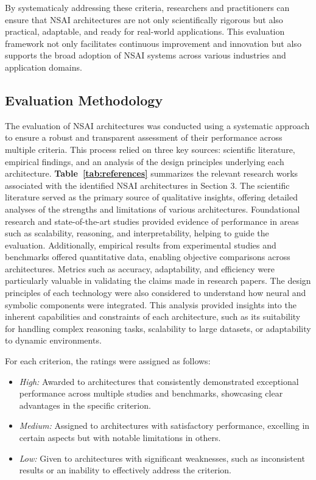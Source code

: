 \documentclass[12pt]{article}
\begin{document}
\noindent By systematicaly addressing these criteria, researchers and practitioners can ensure that NSAI architectures are not only scientifically rigorous but also practical, adaptable, and ready for real-world applications. This evaluation framework not only facilitates continuous improvement and innovation but also supports the broad adoption of NSAI systems across various industries and application domains.

\subsection{Evaluation Methodology}

\noindent The evaluation of NSAI architectures was conducted using a systematic approach to ensure a robust and transparent assessment of their performance across multiple criteria. This process relied on three key sources: scientific literature, empirical findings, and an analysis of the design principles underlying each architecture. \textbf{Table~\ref{tab:references}} summarizes the relevant research works associated with the identified NSAI architectures in Section 3. %
 The scientific literature served as the primary source of qualitative insights, offering detailed analyses of the strengths and limitations of various architectures. Foundational research and state-of-the-art studies provided evidence of performance in areas such as scalability, reasoning, and interpretability, helping to guide the evaluation. Additionally, empirical results from experimental studies and benchmarks offered quantitative data, enabling objective comparisons across architectures. Metrics such as accuracy, adaptability, and efficiency were particularly valuable in validating the claims made in research papers. The design principles of each technology were also considered to understand how neural and symbolic components were integrated. This analysis provided insights into the inherent capabilities and constraints of each architecture, such as its suitability for handling complex reasoning tasks, scalability to large datasets, or adaptability to dynamic environments.

\vspace*{0.5cm}

\noindent For each criterion, the ratings were assigned as follows:

\begin{itemize}
    \item \textit{High:} Awarded to architectures that consistently demonstrated exceptional performance across multiple studies and benchmarks, showcasing clear advantages in the specific criterion.
    \item \textit{Medium:} Assigned to architectures with satisfactory performance, excelling in certain aspects but with notable limitations in others.
    \item \textit{Low:} Given to architectures with significant weaknesses, such as inconsistent results or an inability to effectively address the criterion.
\end{itemize}
\end{document}
